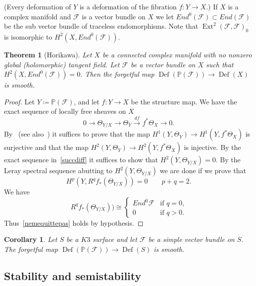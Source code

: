 \documentclass[11pt]{amsart}
\newcommand{\PP}{{\mathbb P}}
\let\mathcal\mathscr
\def\cF{\mathcal{F}}
\DeclareMathOperator{\Def}{Def}
\DeclareMathOperator{\Ext}{Ext}
\def\lra{\longrightarrow}
\newtheorem{thm}[lmm]{Theorem}
\newtheorem{crl}[lmm]{Corollary}
\theoremstyle{definition}
\theoremstyle{remark}
\begin{document}
%
(Every deformation of $Y$ is a deformation of the fibration $f\colon Y\to X$.)
If $X$ is a complex manifold  and $\cF$ is a vector bundle on $X$ we let $End^0(\cF)\subset End(\cF)$ be the sub vector bundle of traceless endomorphisms. 
Note that $\Ext^2(\cF,\cF)_0$ is isomorphic to $H^2(X,End^0(\cF))$.
%
\begin{thm}[Horikawa]\label{thm:evvivahorikawa}
%
Let $X$ be a connected complex manifold with no nonzero global (holomorphic) tangent field. Let $\cF$ be a vector bundle on $X$ 
such that $H^2(X,End^0(\cF))=0$. Then the  forgetful  map $\Def(\PP(\cF)) \lra \Def(X)$ is 
 smooth.
%
\end{thm}
%
%
\begin{proof}
%
Let $Y\coloneqq \PP(\cF)$, and let $f\colon Y\to X$ be the structure map. We have  the exact sequence of locally free sheaves on $X$
%
\begin{equation}\label{succdiff}
%
0\lra \Theta_{Y/X}\lra \Theta_Y\overset{df}{\lra} f^{*}\Theta_X\lra 0.
%
\end{equation}
%
By~\cite[Theorem 6.1]{horikawa-II} (see also~\cite[Cor.~8.2.14]{manetti-libro}) it suffices to prove that 
the map  $H^1(Y,\Theta_Y)\to H^1(Y,f^{*}\Theta_X)$ is surjective and that the map  $H^2(Y,\Theta_Y)\to H^2(Y,f^{*}\Theta_X)$ is injective. By the exact sequence in~\eqref{succdiff} it suffices to show that $H^2(Y,\Theta_{Y/X})=0$. 
By the Leray spectral sequence abutting to $H^2(Y,\Theta_{Y/X})$ we are done if we prove that 
%
\begin{equation}\label{nemequittepas}
%
H^p(Y,R^q f_{*}(\Theta_{Y/X}))=0\qquad p+q=2.
%
\end{equation}
%
We have
%
\begin{equation}
%
R^q f_{*}(\Theta_{Y/X}))\cong 
%
\begin{cases}
%
End^0 \cF & \text{if $q=0$,} \\
%
0 & \text{if $q>0$.} 
%
\end{cases}
%
%
\end{equation}
%
Thus~\eqref{nemequittepas} holds by hypothesis.
%
\end{proof}
%
%
\begin{crl}\label{crl:martysupreme}
%
Let $S$ be a $K3$ surface and let $\cF$ be a simple vector bundle on $S$. The forgetful 
map $\Def(\PP(\cF)) \lra \Def(S)$ is smooth.
%
\end{crl}
%





%
\subsection{Stability and semistability}
%
%
\setcounter{equation}{0}
%
%
\end{document}
